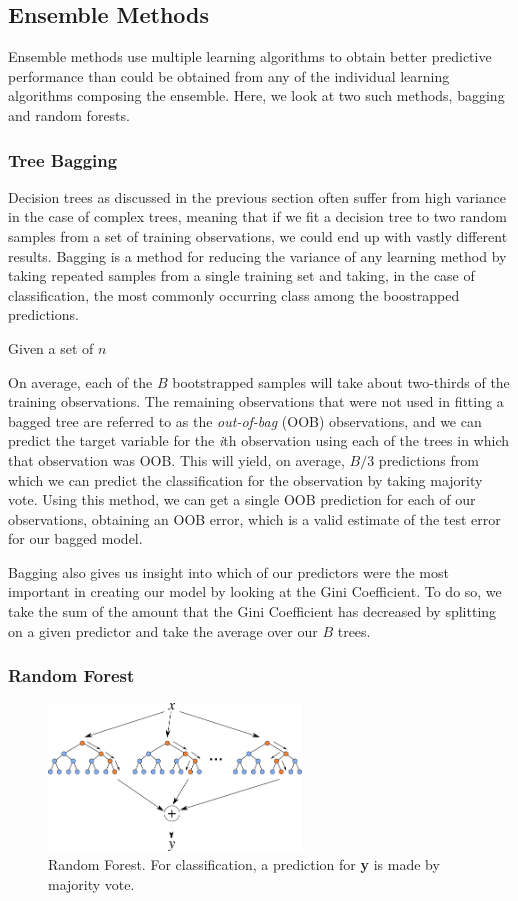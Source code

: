 \documentclass[preprint,12pt]{elsarticle}
\begin{document}
\subsection{Ensemble Methods}
Ensemble methods use multiple learning algorithms to obtain better predictive performance than could be obtained from any of the individual learning algorithms composing the ensemble. Here, we look at two such methods, bagging and random forests.


\subsubsection{Tree Bagging}
Decision trees as discussed in the previous section often suffer from high variance in the case of complex trees, meaning that if we fit a decision tree to two random samples from a set of training observations, we could end up with vastly different results. Bagging is a method for reducing the variance of any learning method by taking repeated samples from a single training set and taking, in the case of classification, the most commonly occurring class among the boostrapped predictions. 

Given a set of $n$ 

On average, each of the $B$ bootstrapped samples will take about two-thirds of the training observations.  The remaining observations that were not used in fitting a bagged tree are referred to as the \textit{out-of-bag} (OOB) observations, and we can predict the target variable for the \textit{i}th observation using each of the trees in which that observation was OOB. This will yield, on average, $B/3$ predictions from which we can predict the classification for the observation by taking majority vote.\cite{ISLR} Using this method, we can get a single OOB prediction for each of our observations, obtaining an OOB error, which is a valid estimate of the test error for our bagged model.

Bagging also gives us insight into which of our predictors were the most important in creating our model by looking at the Gini Coefficient. To do so, we take the sum of the amount that the Gini Coefficient has decreased by splitting on a given predictor and take the average over our $B$ trees.

\subsubsection{Random Forest}


\begin{figure}[h]
	\centering
	\includegraphics[width=0.6\textwidth]{RF}
	\caption{Random Forest. For classification, a prediction for \textbf{y} is made by majority vote.}
\end{figure}
\end{document}
